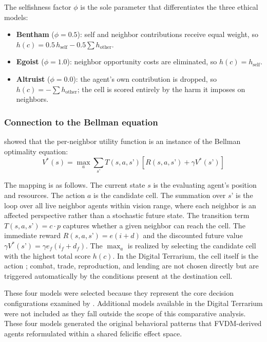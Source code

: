 \documentclass{icsthesis}
\begin{document}
\begin{mainmatter}
The selfishness factor $\phi$ is the sole parameter that differentiates the three ethical models:

\begin{itemize}
    \item \textbf{Bentham} ($\phi = 0.5$): self and neighbor contributions receive equal weight, so $h(c) = 0.5\,h_{\mathrm{self}} - 0.5\sum h_{\mathrm{other}}$.
    \item \textbf{Egoist} ($\phi = 1.0$): neighbor opportunity costs are eliminated, so $h(c) = h_{\mathrm{self}}$.
    \item \textbf{Altruist} ($\phi = 0.0$): the agent’s own contribution is dropped, so $h(c) = -\sum h_{\mathrm{other}}$; the cell is scored entirely by the harm it imposes on neighbors.
\end{itemize}

\subsubsection*{Connection to the Bellman equation}

\citet{KremerHerman2024b} showed that the per-neighbor utility function is an instance of the Bellman optimality equation:
\[
V^{*}(s) = \max_{a} \sum_{s’} T(s,a,s’) \left[ R(s,a,s’) + \gamma V^{*}(s’) \right]
\]

The mapping is as follows. The current state $s$ is the evaluating agent’s position and resources. The action $a$ is the candidate cell. The summation over $s’$ is the loop over all live neighbor agents within vision range, where each neighbor is an affected perspective rather than a stochastic future state. The transition term $T(s,a,s’) = c \cdot p$ captures whether a given neighbor can reach the cell. The immediate reward $R(s,a,s’) = e(i+d)$ and the discounted future value $\gamma V^{*}(s’) = \gamma e_f(i_f+d_f)$. The $\max_a$ is realized by selecting the candidate cell with the highest total score $h(c)$. In the Digital Terrarium, the cell itself is the action \citep{KremerHerman2024b}; combat, trade, reproduction, and lending are not chosen directly but are triggered automatically by the conditions present at the destination cell.

These four models were selected because they represent the core decision configurations examined by \citet{KremerHerman2024b}. Additional models available in the Digital Terrarium were not included as they fall outside the scope of this comparative analysis. These four models generated the original behavioral patterns that FVDM-derived agents reformulated within a shared felicific effect space.


\end{mainmatter}
\end{document}
